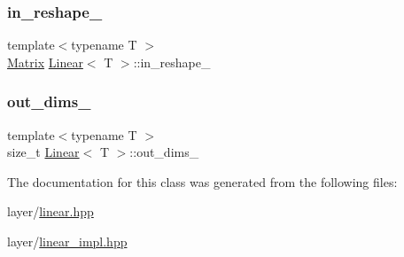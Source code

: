 \mbox{\label{class_linear_a52fbc58c45b62d75089fc627c5210455}} 
\subsubsection{\texorpdfstring{in\_reshape\_}{in\_reshape\_}}
{\footnotesize\ttfamily template$<$typename T $>$ \\
\mbox{\hyperlink{class_layer_a22b1e7286096aa62bd245536c8ebdaf1}{Matrix}} \mbox{\hyperlink{class_linear}{Linear}}$<$ T $>$\+::in\+\_\+reshape\+\_\+\hspace{0.3cm}{\ttfamily [protected]}}

\mbox{\label{class_linear_affb0e56f0ca748a62e4aa5ce5733b491}} 
\subsubsection{\texorpdfstring{out\_dims\_}{out\_dims\_}}
{\footnotesize\ttfamily template$<$typename T $>$ \\
size\+\_\+t \mbox{\hyperlink{class_linear}{Linear}}$<$ T $>$\+::out\+\_\+dims\+\_\+\hspace{0.3cm}{\ttfamily [protected]}}



The documentation for this class was generated from the following files\+:\begin{DoxyCompactItemize}
\item 
layer/\mbox{\hyperlink{linear_8hpp}{linear.\+hpp}}\item 
layer/\mbox{\hyperlink{linear__impl_8hpp}{linear\+\_\+impl.\+hpp}}\end{DoxyCompactItemize}
